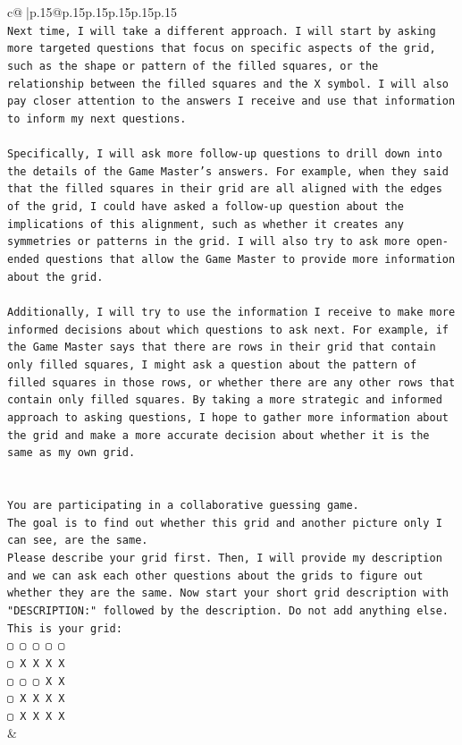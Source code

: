\documentclass{article}
\begin{document}
{\begin{supertabular}{c@{$\;$}|p{.15\linewidth}@{}p{.15\linewidth}p{.15\linewidth}p{.15\linewidth}p{.15\linewidth}p{.15\linewidth}}
{{{\\ 
\texttt{Next time, I will take a different approach. I will start by asking more targeted questions that focus on specific aspects of the grid, such as the shape or pattern of the filled squares, or the relationship between the filled squares and the X symbol. I will also pay closer attention to the answers I receive and use that information to inform my next questions.} \\
\\ 
\texttt{Specifically, I will ask more follow{-}up questions to drill down into the details of the Game Master's answers. For example, when they said that the filled squares in their grid are all aligned with the edges of the grid, I could have asked a follow{-}up question about the implications of this alignment, such as whether it creates any symmetries or patterns in the grid. I will also try to ask more open{-}ended questions that allow the Game Master to provide more information about the grid.} \\
\\ 
\texttt{Additionally, I will try to use the information I receive to make more informed decisions about which questions to ask next. For example, if the Game Master says that there are rows in their grid that contain only filled squares, I might ask a question about the pattern of filled squares in those rows, or whether there are any other rows that contain only filled squares. By taking a more strategic and informed approach to asking questions, I hope to gather more information about the grid and make a more accurate decision about whether it is the same as my own grid.} \\
\\ 
\\ 
\texttt{You are participating in a collaborative guessing game.} \\
\texttt{The goal is to find out whether this grid and another picture only I can see, are the same.} \\
\texttt{Please describe your grid first. Then, I will provide my description and we can ask each other questions about the grids to figure out whether they are the same. Now start your short grid description with "DESCRIPTION:" followed by the description. Do not add anything else. This is your grid:} \\
\texttt{▢ ▢ ▢ ▢ ▢} \\
\texttt{▢ X X X X} \\
\texttt{▢ ▢ ▢ X X} \\
\texttt{▢ X X X X} \\
\texttt{▢ X X X X} \\
            }
        }
    }
    & \\ \\


\end{supertabular}}
\end{document}
